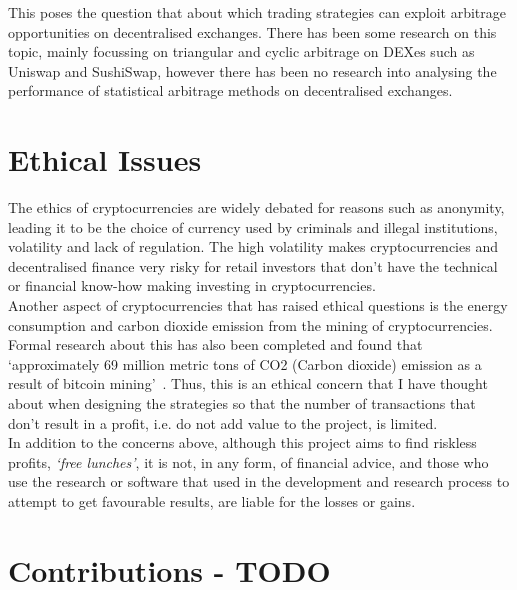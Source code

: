 This poses the question that about which trading strategies can exploit arbitrage opportunities on decentralised exchanges. There has been some research on this topic, mainly focussing on triangular and cyclic arbitrage on DEXes such as Uniswap and SushiSwap, however there has been no research into analysing the performance of statistical arbitrage methods on decentralised exchanges.

\section{Ethical Issues}

The ethics of cryptocurrencies are widely debated for reasons such as anonymity, leading it to be the choice of currency used by criminals and illegal institutions, volatility and lack of regulation. The high volatility makes cryptocurrencies and decentralised finance very risky for retail investors that don't have the technical or financial know-how making investing in cryptocurrencies.
\\[5mm]
Another aspect of cryptocurrencies that has raised ethical questions is the energy consumption and carbon dioxide emission from the mining of cryptocurrencies. Formal research about this has also been completed and found that `approximately 69 million metric tons of CO2 (Carbon dioxide) emission as a result of bitcoin mining'~\cite{egiyi2020cryptocurrency}. Thus, this is an ethical concern that I have thought about when designing the strategies so that the number of transactions that don't result in a profit, i.e. do not add value to the project, is limited.
\\[5mm]
In addition to the concerns above, although this project aims to find riskless profits, \textit{`free lunches'}, it is not, in any form, of financial advice, and those who use the research or software that used in the development and research process to attempt to get favourable results, are liable for the losses or gains. 



\section{Contributions - TODO}